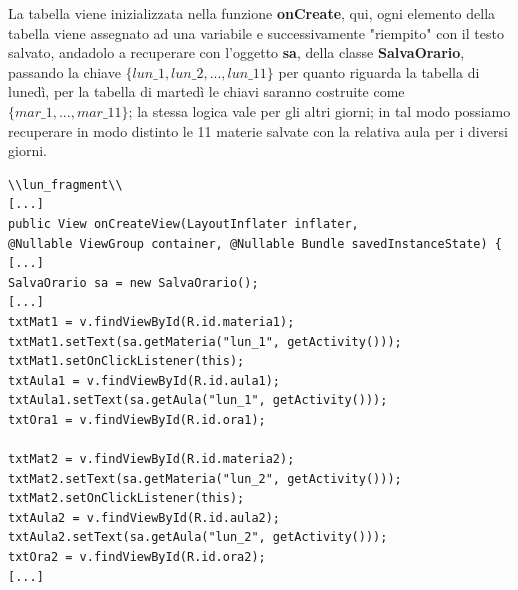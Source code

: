 \documentclass[a4paper, 50pt, twoside]{article}
\begin{document}
La tabella viene inizializzata nella funzione \textbf{onCreate}, qui, ogni elemento della tabella viene assegnato ad una variabile e successivamente "riempito" con il testo salvato, andadolo a recuperare con l'oggetto \textbf{sa}, della classe \textbf{SalvaOrario}, passando la chiave $\{lun\_1, lun\_2,..., lun\_11\}$ per quanto riguarda la tabella di lunedì, per la tabella di martedì le chiavi saranno costruite come $\{mar\_1,...,mar\_11\}$; la stessa logica vale per gli altri giorni; in tal modo possiamo recuperare in modo distinto le 11 materie salvate con la relativa aula per i diversi giorni.

\begin{lstlisting}
\\lun_fragment\\
[...]
public View onCreateView(LayoutInflater inflater, 
@Nullable ViewGroup container, @Nullable Bundle savedInstanceState) {
[...]
SalvaOrario sa = new SalvaOrario();
[...]
txtMat1 = v.findViewById(R.id.materia1);
txtMat1.setText(sa.getMateria("lun_1", getActivity()));
txtMat1.setOnClickListener(this);
txtAula1 = v.findViewById(R.id.aula1);
txtAula1.setText(sa.getAula("lun_1", getActivity()));
txtOra1 = v.findViewById(R.id.ora1);

txtMat2 = v.findViewById(R.id.materia2);
txtMat2.setText(sa.getMateria("lun_2", getActivity()));
txtMat2.setOnClickListener(this);
txtAula2 = v.findViewById(R.id.aula2);
txtAula2.setText(sa.getAula("lun_2", getActivity()));
txtOra2 = v.findViewById(R.id.ora2);
[...]
\end{lstlisting}
\end{document}
